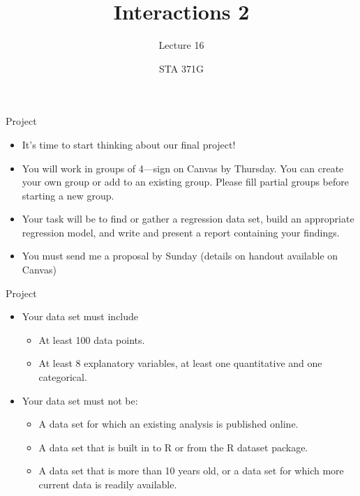 \documentclass{beamer}\usepackage[]{graphicx}\usepackage[]{color}
\title{Interactions 2}
\subtitle{Lecture 16}
\author{STA 371G}
\begin{document}
  
  

  \frame{\maketitle}



  \begin{darkframes}
    \begin{frame}{Project}
      \begin{itemize}
        \item It's time to start thinking about our final project!
	\item You will work in groups of 4---sign on Canvas by Thursday. You can create your own group or add to an existing group. Please fill partial groups before starting a new group.
	\item Your task will be to find or gather a regression data set, build an appropriate regression model, and write and present a report containing your findings.
	\item You must send me a proposal by Sunday (details on handout available on Canvas)
      \end{itemize}
    \end{frame}
    \begin{frame}{Project}
      \begin{itemize}
      \item Your data set must include
        \begin{itemize}
        \item  At least 100 data points.
        \item  At least 8 explanatory variables, at least one quantitative and one categorical.
        \end{itemize}
      \item Your data set must not be:
        \begin{itemize}
        \item A data set for which an existing analysis is published online.
        \item A data set that is built in to R or from the R dataset package.
        \item A data set that is more than 10 years old, or a data set for which more current data is readily available.
        \end{itemize}
      \end{itemize}
    \end{frame}


\end{darkframes}
\end{document}
